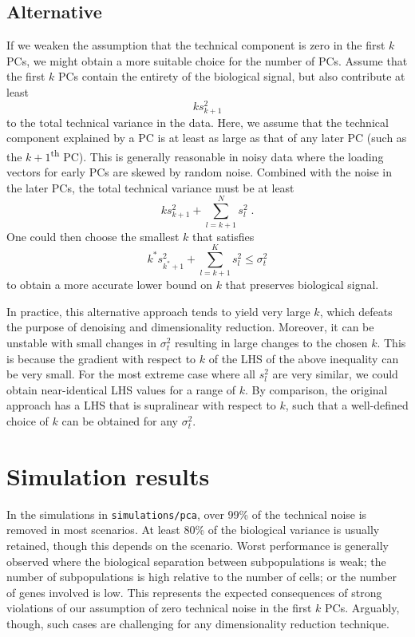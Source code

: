 \documentclass{article}
\begin{document}
\subsection{Alternative}
If we weaken the assumption that the technical component is zero in the first $k$ PCs, we might obtain a more suitable choice for the number of PCs.
Assume that the first $k$ PCs contain the entirety of the biological signal, but also contribute at least
\[
    k s^2_{k+1} 
\]
to the total technical variance in the data. 
Here, we assume that the technical component explained by a PC is at least as large as that of any later PC (such as the $k+1$\textsuperscript{th} PC).
This is generally reasonable in noisy data where the loading vectors for early PCs are skewed by random noise.
Combined with the noise in the later PCs, the total technical variance must be at least
\[
    k s^2_{k+1} + \sum_{l=k+1}^N s^2_l \;.
\]
One could then choose the smallest $k$ that satisfies
\[
    k^* s^2_{k^*+1} + \sum_{l=k+1}^K s^2_l \le \sigma^2_t  
\]
to obtain a more accurate lower bound on $k$ that preserves biological signal.

In practice, this alternative approach tends to yield very large $k$, which defeats the purpose of denoising and dimensionality reduction.
Moreover, it can be unstable with small changes in $\sigma^2_t$ resulting in large changes to the chosen $k$.
This is because the gradient with respect to $k$ of the LHS of the above inequality can be very small.
For the most extreme case where all $s^2_l$ are very similar, we could obtain near-identical LHS values for a range of $k$.
By comparison, the original approach has a LHS that is supralinear with respect to $k$, such that a well-defined choice of $k$ can be obtained for any $\sigma^2_t$.

\section{Simulation results}
In the simulations in \verb!simulations/pca!, over 99\% of the technical noise is removed in most scenarios.
At least 80\% of the biological variance is usually retained, though this depends on the scenario.
Worst performance is generally observed where the biological separation between subpopulations is weak;
the number of subpopulations is high relative to the number of cells; or the number of genes involved is low.
This represents the expected consequences of strong violations of our assumption of zero technical noise in the first $k$ PCs.
Arguably, though, such cases are challenging for any dimensionality reduction technique.
\end{document}
